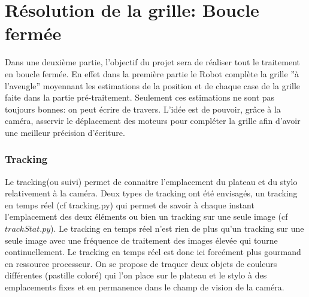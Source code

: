 \documentclass[12pt]{article}
\begin{document}
\part{Résolution de la grille: Boucle fermée}

Dans une deuxième partie, l'objectif du projet sera de réaliser tout le traitement en boucle fermée. En effet dans la première partie le Robot complète la grille ''à l'aveugle'' moyennant les estimations de la position et de chaque case de la grille faite dans la partie pré-traitement. Seulement ces estimations ne sont pas toujours bonnes: on peut écrire de travers. L'idée est de pouvoir, grâce à la caméra, asservir le déplacement des moteurs pour compléter la grille afin d'avoir une meilleur précision d'écriture.

\section{Tracking}
Le tracking(ou suivi) permet de connaitre l'emplacement du plateau et du stylo relativement à la caméra. Deux types de tracking ont été envisagés, un tracking en temps réel (cf tracking.py) qui permet de savoir  à chaque instant l'emplacement des deux éléments ou bien un tracking sur une seule image (cf $trackStat.py$). Le tracking en temps réel n'est rien de plus qu'un tracking sur une seule image avec une fréquence de traitement des images élevée qui tourne continuellement. Le tracking en temps réel est donc ici forcément plus gourmand en ressource processeur. On se propose de traquer deux objets de couleurs différentes (pastille coloré) qui l'on place sur le plateau et le stylo à des emplacements fixes et en permanence dans le champ de vision de la caméra.\\
\end{document}
